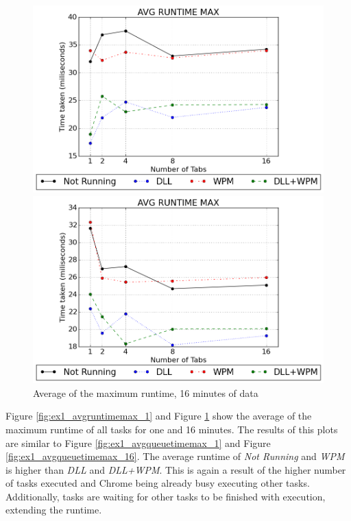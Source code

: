 \begin{figure}[!htbp]
	\centering
    \includegraphics[width=\textwidth,height=0.45\textheight,keepaspectratio]{Evaluation/experiment1/AVG-RUNTIME-MAX-1.png}
    \caption{Average of the maximum runtime, 1 minute of data}
    \label{fig:ex1_avgruntimemax_1}
    
  	\vspace*{\floatsep}    
    
    \includegraphics[width=\textwidth,height=0.45\textheight,keepaspectratio]{Evaluation/experiment1/AVG-RUNTIME-MAX-16.png}
    \caption{Average of the maximum runtime, 16 minutes of data}
    \label{fig:ex1_avgruntimemax_16}
\end{figure}
Figure \ref{fig:ex1_avgruntimemax_1} and Figure \ref{fig:ex1_avgruntimemax_16} show the average of the maximum runtime of all tasks for one and 16 minutes. The results of this plots are similar to Figure \ref{fig:ex1_avgqueuetimemax_1} and Figure \ref{fig:ex1_avgqueuetimemax_16}. The average runtime of \emph{Not Running} and \emph{\gls{WPM}} is higher than \emph{\gls{DLL}} and \emph{\gls{DLL}+\gls{WPM}}. This is again a result of the higher number of tasks executed and Chrome being already busy executing other tasks. Additionally, tasks are waiting for other tasks to be finished with execution, extending the runtime.
